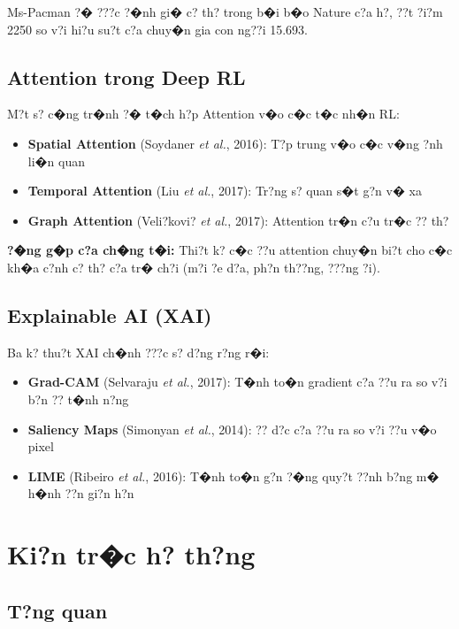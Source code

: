 \documentclass[11pt,a4paper]{article}
\begin{document}
Ms-Pacman ?� ???c ?�nh gi� c? th? trong b�i b�o Nature c?a h?, ??t ?i?m 2250 so v?i hi?u su?t c?a chuy�n gia con ng??i 15.693.

\subsection{Attention trong Deep RL}

M?t s? c�ng tr�nh ?� t�ch h?p Attention v�o c�c t�c nh�n RL:
\begin{itemize}
    \item \textbf{Spatial Attention} (Soydaner \textit{et al.}, 2016): T?p trung v�o c�c v�ng ?nh li�n quan
    \item \textbf{Temporal Attention} (Liu \textit{et al.}, 2017): Tr?ng s? quan s�t g?n v� xa
    \item \textbf{Graph Attention} (Veli?kovi? \textit{et al.}, 2017): Attention tr�n c?u tr�c ?? th?
\end{itemize}

\textbf{?�ng g�p c?a ch�ng t�i:} Thi?t k? c�c ??u attention chuy�n bi?t cho c�c kh�a c?nh c? th? c?a tr� ch?i (m?i ?e d?a, ph?n th??ng, ???ng ?i).

\subsection{Explainable AI (XAI)}

Ba k? thu?t XAI ch�nh ???c s? d?ng r?ng r�i:

\begin{itemize}
    \item \textbf{Grad-CAM} (Selvaraju \textit{et al.}, 2017): T�nh to�n gradient c?a ??u ra so v?i b?n ?? t�nh n?ng
    \item \textbf{Saliency Maps} (Simonyan \textit{et al.}, 2014): ?? d?c c?a ??u ra so v?i ??u v�o pixel
    \item \textbf{LIME} (Ribeiro \textit{et al.}, 2016): T�nh to�n g?n ?�ng quy?t ??nh b?ng m� h�nh ??n gi?n h?n
\end{itemize}

\section{Ki?n tr�c h? th?ng}

\subsection{T?ng quan}
\end{document}
